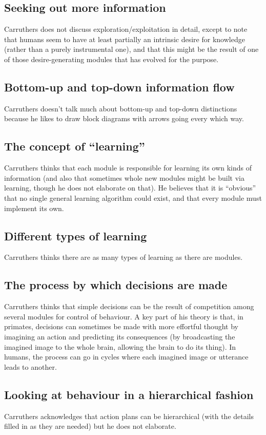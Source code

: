 \documentclass[10pt,a4paper]{article}
\newcommand{\nquote}[1]{``{#1}''}
\begin{document}
\subsection{Seeking out more information}
Carruthers does not discuss exploration/exploitation in detail, except to note that humans seem to have at least partially an intrinsic desire for knowledge (rather than a purely instrumental one), and that this might be the result of one of those desire-generating modules that has evolved for the purpose.

\subsection{Bottom-up and top-down information flow}
Carruthers doesn't talk much about bottom-up and top-down distinctions because he likes to draw block diagrams with arrows going every which way.

\subsection{The concept of \nquote{learning}}
Carruthers thinks that each module is responsible for learning its own kinds of information (and also that sometimes whole new modules might be built via learning, though he does not elaborate on that). He believes that it is \nquote{obvious} that no single general learning algorithm could exist, and that every module must implement its own.

\subsection{Different types of learning}
Carruthers thinks there are as many types of learning as there are modules.

\subsection{The process by which decisions are made}
Carruthers thinks that simple decisions can be the result of competition among several modules for control of behaviour. A key part of his theory is that, in primates, decisions can sometimes be made with more effortful thought by imagining an action and predicting its consequences (by broadcasting the imagined image to the whole brain, allowing the brain to do its thing). In humans, the process can go in cycles where each imagined image or utterance leads to another.

\subsection{Looking at behaviour in a hierarchical fashion}
Carruthers acknowledges that action plans can be hierarchical (with the details filled in as they are needed) but he does not elaborate.
\end{document}
